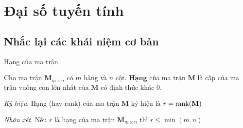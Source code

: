 \section{Đại số tuyến tính}

\subsection{Nhắc lại các khái niệm cơ bản}

\begin{defblock}{Hạng của ma trận}
    
    Cho ma trận $\mathbf{M}_{m \times n}$ có $m$ hàng và $n$ cột. \textbf{Hạng} của ma trận $\mathbf{M}$ là cấp của ma trận vuông con lớn nhất của $\mathbf{M}$ có định thức khác 0.

    \textit{Ký hiệu}. Hạng (hay rank) của ma trận $\mathbf{M}$ ký hiệu là $r = \text{rank}(\mathbf{M})$

    \textit{Nhận xét}. Nếu $r$ là hạng của ma trận $\mathbf{M}_{m \times n}$ thì $r \leq \min (m, n)$
\end{defblock}

\newpage